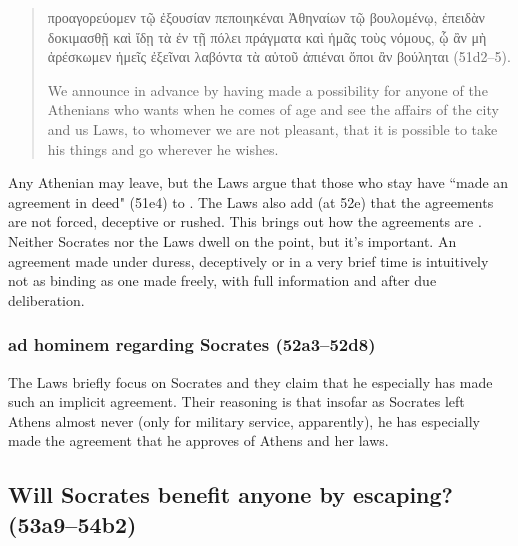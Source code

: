 \documentclass[11pt]{article}
\begin{document}
\begin{quote}
    {\g προαγορεύομεν τῷ ἐξουσίαν πεποιηκέναι Ἀθηναίων τῷ βουλομένῳ, ἐπειδὰν
    δοκιμασθῇ καὶ ἴδῃ τὰ ἐν τῇ πόλει πράγματα καὶ ἡμᾶς τοὺς νόμους, ᾧ ἂν μὴ
    ἀρέσκωμεν ἡμεῖς ἐξεῖναι λαβόντα τὰ αὑτοῦ ἀπιέναι ὅποι ἂν βούληται}
    (51d2--5).

    We announce in advance by having made a possibility for anyone of the
    Athenians who wants when he comes of age and see the affairs of the city
    and us Laws, to whomever we are not pleasant, that it is possible to take
    his things and go wherever he wishes.
\end{quote}

Any Athenian may leave, but the Laws argue that those who stay have ``made an
agreement in deed" (51e4) to .  The Laws also add (at
52e) that the agreements are not forced, deceptive or rushed.  This brings out
how the agreements are .  Neither Socrates nor the Laws dwell on the
point, but it's important.  An agreement made under duress, deceptively or in
a very brief time is intuitively not as binding as one made freely, with full
information and after due deliberation.


\subsubsection{ad hominem regarding Socrates (52a3--52d8)}

The Laws briefly focus on Socrates and they claim that he especially has made
such an implicit agreement.  Their reasoning is that insofar as Socrates left
Athens almost never (only for military service, apparently), he has especially
made the  agreement that he approves of Athens and her laws.


\subsection{Will Socrates benefit anyone by escaping? (53a9--54b2)}
\end{document}
